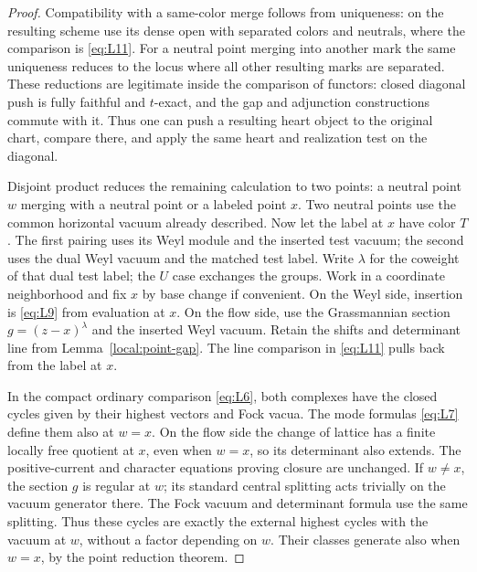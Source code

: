 \documentclass[11pt]{article}
\numberwithin{equation}{section}
\theoremstyle{definition}
\theoremstyle{remark}
\begin{document}
\begin{proof}
Compatibility with a same-color merge follows from uniqueness:
on the resulting scheme use its dense open with separated
colors and neutrals, where the comparison is \eqref{eq:L11}.
For a neutral point merging into another mark the same uniqueness
reduces to the locus where all other resulting marks are separated.
These reductions are legitimate inside the comparison of functors:
closed diagonal push is fully faithful and $t$-exact, and the gap
and adjunction constructions commute with it.  Thus one can push
a resulting heart object to the original chart, compare there,
and apply the same heart and realization test on the diagonal.

Disjoint product reduces the remaining calculation to two points:
a neutral point $w$ merging with a neutral point or a labeled
point $x$.  Two neutral points use the common horizontal vacuum
already described.  Now let the label at $x$ have color $T$.
The first pairing uses its Weyl module and the inserted test vacuum;
the second uses the dual Weyl vacuum and the matched test label.
Write $\lambda$ for the coweight of that dual test label; the $U$
case exchanges the groups.  Work in a coordinate neighborhood and
fix $x$ by base change if convenient.  On the
Weyl side, insertion is \eqref{eq:L9} from evaluation at $x$.
On the flow side, use the Grassmannian section
$g=(z-x)^\lambda$ and the inserted Weyl vacuum.  Retain the shifts
and determinant line from Lemma~\ref{local:point-gap}.  The line
comparison in \eqref{eq:L11} pulls back from the label at $x$.

In the compact ordinary comparison \eqref{eq:L6}, both complexes
have the closed cycles given by their highest vectors and Fock
vacua.  The mode formulas \eqref{eq:L7} define them also at $w=x$.
On the flow side the change of lattice has a finite locally free
quotient at $x$, even when $w=x$, so its determinant also extends.
The positive-current and character equations proving closure
are unchanged.  If $w\ne x$, the section $g$ is regular at $w$;
its standard central splitting acts trivially on the vacuum
generator there.  The Fock vacuum and determinant formula use
the same splitting.  Thus these cycles are exactly the external
highest cycles with the vacuum at $w$, without a factor depending
on $w$.  Their classes generate also when $w=x$, by the point
reduction theorem.


\end{proof}
\end{document}
